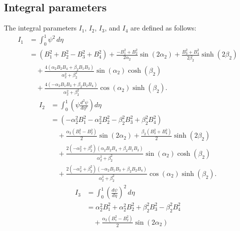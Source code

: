 \documentclass[preprint,12pt]{elsarticle}
\begin{document}
\FloatBarrier
\begin{appendices}
\renewcommand{\theequation}{\thesection.\arabic{equation}}
\section{Integral parameters}\label{sec:appendA}
The integral parameters $ I_1$, $I_2$, $I_3$, and $ I_4$ are defined as follows:
%
\begin{equation}\label{eq:inte_phi}
	\begin{aligned}
		I_1 &= \int_{0}^{1} \psi^2 \, d\eta \\
		&= (B_1^2 + B_2^2 - B_3^2 + B_4^2) 
		+ \frac{-B_1^2 + B_2^2}{2\alpha_2} \sin(2\alpha_2) 
		+ \frac{B_3^2 + B_4^2}{2\beta_2} \sinh(2\beta_2) \\
		&\quad + \frac{4(\alpha_2 B_2B_4 + \beta_2 B_1B_3)}{\alpha_2^2 + \beta_2^2} \sin(\alpha_2) \cosh(\beta_2) \\
		&\quad + \frac{4(-\alpha_2 B_1B_3 + \beta_2 B_2B_4)}{\alpha_2^2 + \beta_2^2} \cos(\alpha_2) \sinh(\beta_2).
	\end{aligned}
\end{equation}
%
\begin{equation}\label{eq:inte_dphi2}
\begin{split}
	I_2 &= \int_{0}^{1} \left( \psi \frac{d^2 \psi}{d \eta^2} \right) d \eta \\
	&= \left( -\alpha_2^2 B_1^2 - \alpha_2^2 B_2^2 - \beta_2^2 B_3^2 + \beta_2^2 B_4^2 \right) \\
	&\quad + \frac{\alpha_2 (B_1^2 - B_2^2)}{2} \sin(2 \alpha_2) 
	 + \frac{\beta_2 (B_3^2 + B_4^2)}{2} \sinh(2 \beta_2) \\
	&\quad + \frac{2(-\alpha_2^2 + \beta_2^2) (\alpha_2 B_2 B_4 + \beta_2 B_1 B_3)}{\alpha_2^2 + \beta_2^2} \sin(\alpha_2) \cosh(\beta_2) \\
	&\quad + \frac{2(-\alpha_2^2 + \beta_2^2) (-\alpha_2 B_1 B_3 + \beta_2 B_2 B_4)}{\alpha_2^2 + \beta_2^2} \cos(\alpha_2) \sinh(\beta_2).
\end{split}
\end{equation}
%
\begin{equation}\label{eq:inte_dphi3}
	\begin{aligned}
		I_3 &= \int_{0}^{1} \left(\frac{d\psi}{d\eta}\right)^2 \, d\eta \\
		&= \alpha_2^2 B_1^2 + \alpha_2^2 B_2^2 + \beta_2^2 B_3^2 - \beta_2^2 B_4^2 \\
		&\quad + \frac{\alpha_2 (B_1^2 - B_2^2)}{2} \sin(2\alpha_2) 

\end{aligned}
\end{equation}
\end{appendices}
\end{document}

